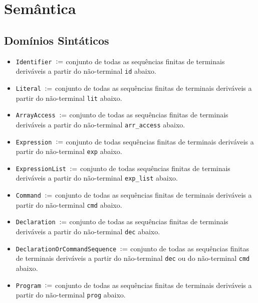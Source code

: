 \documentclass[12pt]{article}
\newcommand{\defeq}{\vcentcolon=}
\begin{document}
\section{Semântica}

\subsection{Domínios Sintáticos}

\begin{itemize}
\item {\tt Identifier $\defeq$} conjunto de todas as sequências finitas de terminais deriváveis a partir do não-terminal {\tt id} abaixo.

\item {\tt Literal $\defeq$} conjunto de todas as sequências finitas de terminais deriváveis a partir do não-terminal {\tt lit} abaixo.

\item {\tt ArrayAccess $\defeq$} conjunto de todas as sequências finitas de terminais deriváveis a partir do não-terminal {\tt arr\_access} abaixo.

\item {\tt Expression $\defeq$} conjunto de todas sequências finitas de terminais deriváveis a partir do não-terminal {\tt exp} abaixo.

\item {\tt ExpressionList $\defeq$} conjunto de todas sequências finitas de terminais deriváveis a partir do não-terminal {\tt exp\_list} abaixo.

\item {\tt Command $\defeq$} conjunto de todas as sequências finitas de terminais deriváveis a partir do não-terminal {\tt cmd} abaixo.

\item {\tt Declaration $\defeq$} conjunto de todas as sequências finitas de terminais deriváveis a partir do não-terminal {\tt dec} abaixo.

\item {\tt DeclarationOrCommandSequence $\defeq$} conjunto de todas as sequências finitas de terminais deriváveis a partir do não-terminal {\tt dec} ou do não-terminal {\tt cmd} abaixo.

\item {\tt Program $\defeq$} conjunto de todas as sequências finitas de terminais deriváveis a partir do não-terminal {\tt prog} abaixo.

\end{itemize}
\end{document}
